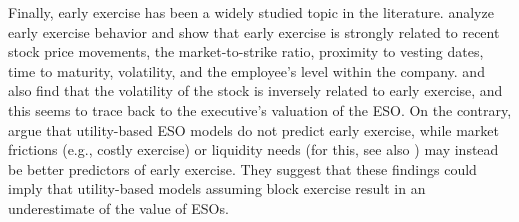     Finally, early exercise has been a widely studied topic in the literature. \citet{huddart1996employee} analyze early exercise behavior and show that early exercise is strongly related to recent stock price movements, the market-to-strike ratio, proximity to vesting dates, time to maturity, volatility, and the employee's level within the company. \citet{heron2017stock} and \citet{izhakian2017risk} also find that the volatility of the stock is inversely related to early exercise, and this seems to trace back to the executive's valuation of the ESO. On the contrary, \citet{grasselli2009risk} argue that utility-based ESO models do not predict early exercise, while market frictions (e.g., costly exercise) or liquidity needs (for this, see also \citet{murphy2019employees}) may instead be better predictors of early exercise. They suggest that these findings could imply that utility-based models assuming block exercise result in an underestimate of the value of ESOs.
 


